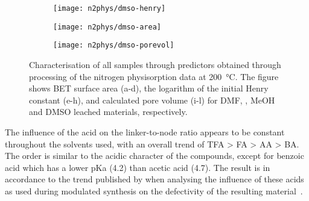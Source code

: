 \begin{figure}[p]
    \begin{subfigure}{0.33\linewidth}
		\parbox[c]{0.12\linewidth}{\caption{}%
			\label{def:fig:n2phys-dmso-henry}}%
		\parbox[b]{0.88\linewidth}{%
			\texttt{[image: n2phys/dmso-henry]}%
		}%
    \end{subfigure}%
    \begin{subfigure}{0.33\linewidth}
		\parbox[c]{0.12\linewidth}{\caption{}%
			\label{def:fig:n2phys-dmso-area}}%
		\parbox[b]{0.88\linewidth}{%
			\texttt{[image: n2phys/dmso-area]}%
		}%
    \end{subfigure}%
    \begin{subfigure}{0.33\linewidth}
		\parbox[c]{0.12\linewidth}{\caption{}%
			\label{def:fig:n2phys-dmso-porevol}}%
		\parbox[b]{0.88\linewidth}{%
			\texttt{[image: n2phys/dmso-porevol]}%
		}%
    \end{subfigure}%

    \caption{Characterisation of all samples through predictors
    obtained through processing of the nitrogen physisorption 
    data at \SI{200}{\degreeCelsius}. The figure shows BET surface
    area (a-d), the logarithm of the initial Henry constant (e-h), 
    and calculated pore volume (i-l) for DMF, , MeOH and 
    DMSO leached materials, respectively.}%
    \label{def:fig:nitrogen-predictors}
    
\end{figure}

The influence of the acid on the linker-to-node ratio appears to be
constant throughout the solvents used, with an overall trend of 
TFA > FA > AA > BA. The order is similar
to the acidic character of the compounds, except for
benzoic acid which has a lower pKa (4.2) than acetic acid (4.7).
The result is in accordance to the trend published by 
\citeauthor{shearerDefectEngineeringTuning2016} when analysing
the influence of these acids as used during modulated synthesis on the
defectivity of the resulting material~\cite{shearerDefectEngineeringTuning2016}.

